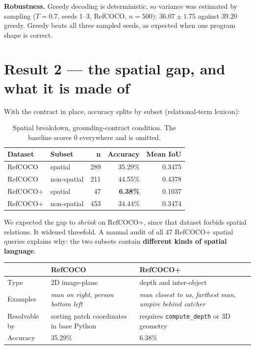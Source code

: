 \documentclass[11pt,a4paper]{article}
\newcommand{\down}[1]{\textcolor{bad}{\textbf{#1}}}
\begin{document}
\textbf{Robustness.} Greedy decoding is deterministic, so variance was estimated by
sampling ($T{=}0.7$, seeds 1--3, RefCOCO, $n{=}500$): $36.07 \pm 1.75$ against
$39.20$ greedy. Greedy beats all three sampled seeds, as expected when one program
shape is correct.

\section{Result 2 — the spatial gap, and what it is made of}

With the contract in place, accuracy splits by subset (relational-term lexicon):

\begin{table}[htbp]\centering\small
\caption{Spatial breakdown, grounding-contract condition. The baseline scores 0
everywhere and is omitted.}
\label{tab:spatial}
\begin{tabular}{@{}llrrr@{}}
\toprule
\textbf{Dataset} & \textbf{Subset} & \textbf{n} & \textbf{Accuracy} & \textbf{Mean IoU} \\
\midrule
RefCOCO  & spatial     & 289 & 35.29\% & 0.3475 \\
RefCOCO  & non-spatial & 211 & 44.55\% & 0.4378 \\
RefCOCO+ & spatial     & 47  & \down{6.38\%} & 0.1037 \\
RefCOCO+ & non-spatial & 453 & 34.44\% & 0.3474 \\
\bottomrule
\end{tabular}
\end{table}

We expected the gap to \emph{shrink} on RefCOCO+, since that dataset forbids spatial
relations. It widened threefold. A manual audit of all 47 RefCOCO+ spatial queries
explains why: the two subsets contain \textbf{different kinds of spatial language}.

\begin{center}\small
\begin{tabular}{@{}p{}p{}p{}@{}}
\toprule
 & \textbf{RefCOCO} & \textbf{RefCOCO+} \\
\midrule
Type & 2D image-plane & depth and inter-object \\
Examples & \emph{man on right}, \emph{person bottom left} & \emph{man closest to us},
\emph{farthest man}, \emph{umpire behind catcher} \\
Resolvable by & sorting patch coordinates in base Python & requires
\texttt{compute\_depth} or 3D geometry \\
Accuracy & 35.29\% & 6.38\% \\
\bottomrule
\end{tabular}
\end{center}
\end{document}
